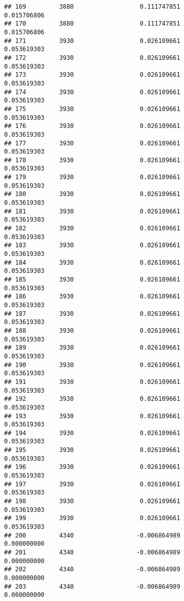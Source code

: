 \documentclass[]{article}
\begin{document}
\begin{verbatim}
## 169         3880                  0.111747851                0.015706806
## 170         3880                  0.111747851                0.015706806
## 171         3930                  0.026109661                0.053619303
## 172         3930                  0.026109661                0.053619303
## 173         3930                  0.026109661                0.053619303
## 174         3930                  0.026109661                0.053619303
## 175         3930                  0.026109661                0.053619303
## 176         3930                  0.026109661                0.053619303
## 177         3930                  0.026109661                0.053619303
## 178         3930                  0.026109661                0.053619303
## 179         3930                  0.026109661                0.053619303
## 180         3930                  0.026109661                0.053619303
## 181         3930                  0.026109661                0.053619303
## 182         3930                  0.026109661                0.053619303
## 183         3930                  0.026109661                0.053619303
## 184         3930                  0.026109661                0.053619303
## 185         3930                  0.026109661                0.053619303
## 186         3930                  0.026109661                0.053619303
## 187         3930                  0.026109661                0.053619303
## 188         3930                  0.026109661                0.053619303
## 189         3930                  0.026109661                0.053619303
## 190         3930                  0.026109661                0.053619303
## 191         3930                  0.026109661                0.053619303
## 192         3930                  0.026109661                0.053619303
## 193         3930                  0.026109661                0.053619303
## 194         3930                  0.026109661                0.053619303
## 195         3930                  0.026109661                0.053619303
## 196         3930                  0.026109661                0.053619303
## 197         3930                  0.026109661                0.053619303
## 198         3930                  0.026109661                0.053619303
## 199         3930                  0.026109661                0.053619303
## 200         4340                 -0.006864989                0.000000000
## 201         4340                 -0.006864989                0.000000000
## 202         4340                 -0.006864989                0.000000000
## 203         4340                 -0.006864989                0.000000000

\end{verbatim}
\end{document}
